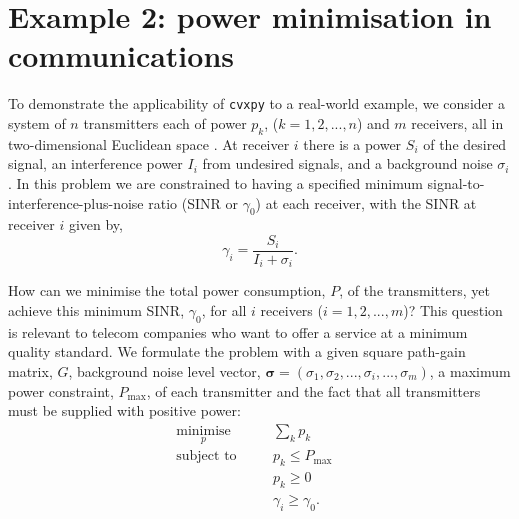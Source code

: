 \documentclass[twocolumn,secnumarabic,amssymb, nobibnotes, aps, prl,superscriptaddress]{revtex4-1}
\begin{document}
\section{Example 2: power minimisation in communications}
\noindent To demonstrate the applicability of \texttt{cvxpy} to  a real-world example, we consider a system of $n$ transmitters each of power $p_k$, ($k=1,2,...,n$) and $m$ receivers, all in two-dimensional Euclidean space \cite{shannon1949}. At receiver $i$ there is a power $S_i$ of the desired signal, an interference power $I_i$ from undesired signals, and a background noise $\sigma_i$. In this problem we are constrained to having a specified minimum signal-to-interference-plus-noise ratio (SINR or $\gamma_0$) at each receiver, with the SINR at receiver $i$ given by,
\begin{equation}
\gamma_i =\frac{S_i}{I_i+\sigma_i}.
\end{equation} 

How can we minimise the total power consumption, $P$, of the transmitters, yet achieve this minimum SINR, $\gamma_0$, for all $i$ receivers ($i = 1,2,...,m$)? This question is relevant to telecom companies who want to offer a service at a minimum quality standard. We formulate the problem with a given square path-gain matrix, $G$, background noise level vector, $\boldsymbol{\sigma} = (\sigma_1, \sigma_2, ..., \sigma_i, ..., \sigma_m)$, a maximum power constraint, $P_{\text{max}}$, of each transmitter and the fact that all transmitters must be supplied with positive power:
\begin{align*}
&\underset{p}{\text{minimise}} \quad &&\sum_k p_k\\
&\text{subject to} \quad &&p_k \leqslant P_{\max}\\
& \quad &&p_k \geqslant 0\\
& \quad &&\gamma_i \geqslant \gamma_0.&&
\end{align*}
\end{document}
